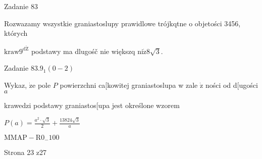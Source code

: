 \documentclass[a4paper,12pt]{article}
\begin{document}
Zadanie 83

Rozwazamy wszystkie graniastoslupy prawidlowe trójkqtne o objetości 3456, których

$\mathrm{k}\mathrm{r}\mathrm{a}\mathrm{w}9^{\mathrm{d}\acute{\mathrm{Z}}}$ podstawy ma dlugośč nie większq $\mathrm{n}\mathrm{i}\dot{\mathrm{z}} 8\sqrt{3}.$

Zadanie $83.9_{1}(0-2)$

Wykaz, $\dot{\mathrm{z}}\mathrm{e}$ pole $P$ powierzchni ca[kowitej graniastoslupa w zale $\dot{\mathrm{z}}$ ności od d[ugości $a$

krawedzi podstawy graniastos[upa jest określone wzorem

$P(a)=\displaystyle \frac{a^{2}\cdot\sqrt{3}}{2}+\frac{13824\sqrt{3}}{a}$

$\mathrm{M}\mathrm{M}\mathrm{A}\mathrm{P}-\mathrm{R}0_{-}100$

Strona 23 z27
\end{document}
